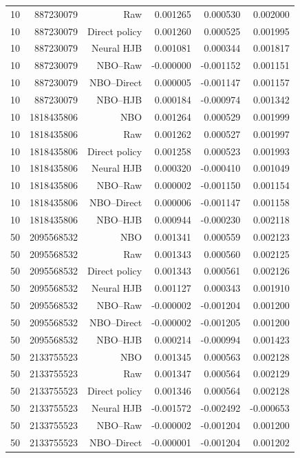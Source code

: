 \begin{longtable}{lrrrrr}
10 & 887230079 & Raw & 0.001265 & 0.000530 & 0.002000 \\
10 & 887230079 & Direct policy & 0.001260 & 0.000525 & 0.001995 \\
10 & 887230079 & Neural HJB & 0.001081 & 0.000344 & 0.001817 \\
10 & 887230079 & NBO--Raw & -0.000000 & -0.001152 & 0.001151 \\
10 & 887230079 & NBO--Direct & 0.000005 & -0.001147 & 0.001157 \\
10 & 887230079 & NBO--HJB & 0.000184 & -0.000974 & 0.001342 \\
10 & 1818435806 & NBO & 0.001264 & 0.000529 & 0.001999 \\
10 & 1818435806 & Raw & 0.001262 & 0.000527 & 0.001997 \\
10 & 1818435806 & Direct policy & 0.001258 & 0.000523 & 0.001993 \\
10 & 1818435806 & Neural HJB & 0.000320 & -0.000410 & 0.001049 \\
10 & 1818435806 & NBO--Raw & 0.000002 & -0.001150 & 0.001154 \\
10 & 1818435806 & NBO--Direct & 0.000006 & -0.001147 & 0.001158 \\
10 & 1818435806 & NBO--HJB & 0.000944 & -0.000230 & 0.002118 \\
50 & 2095568532 & NBO & 0.001341 & 0.000559 & 0.002123 \\
50 & 2095568532 & Raw & 0.001343 & 0.000560 & 0.002125 \\
50 & 2095568532 & Direct policy & 0.001343 & 0.000561 & 0.002126 \\
50 & 2095568532 & Neural HJB & 0.001127 & 0.000343 & 0.001910 \\
50 & 2095568532 & NBO--Raw & -0.000002 & -0.001204 & 0.001200 \\
50 & 2095568532 & NBO--Direct & -0.000002 & -0.001205 & 0.001200 \\
50 & 2095568532 & NBO--HJB & 0.000214 & -0.000994 & 0.001423 \\
50 & 2133755523 & NBO & 0.001345 & 0.000563 & 0.002128 \\
50 & 2133755523 & Raw & 0.001347 & 0.000564 & 0.002129 \\
50 & 2133755523 & Direct policy & 0.001346 & 0.000564 & 0.002128 \\
50 & 2133755523 & Neural HJB & -0.001572 & -0.002492 & -0.000653 \\
50 & 2133755523 & NBO--Raw & -0.000002 & -0.001204 & 0.001200 \\
50 & 2133755523 & NBO--Direct & -0.000001 & -0.001204 & 0.001202 \\

\end{longtable}
